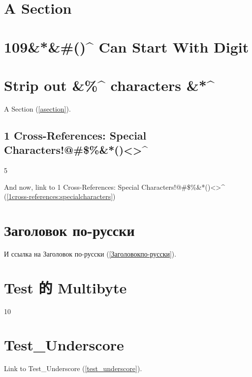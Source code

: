
\def\mytitle{Cross-References}


\part{A Section}
\label{asection}

\part{109\&*\&\#()\^{} Can Start With Digit}
\label{109canstartwithdigit}

\part{Strip out \&\%\^{} characters \&*\^{}}
\label{stripoutcharacters}

A Section (\autoref{asection}).

\chapter{1 Cross-References: Special Characters!@\#\$\%\&*()<>\^{}}
\label{1cross-references:specialcharacters}

5

And now, link to 1 Cross-References: Special Characters!@\#\$\%\&*()<>\^{} (\autoref{1cross-references:specialcharacters})

\part{Заголовок по-русски}
\label{Заголовокпо-русски}

И ссылка на Заголовок по-русски (\autoref{Заголовокпо-русски}).

\part{Test 的 Multibyte}
\label{test的multibyte}

10

\part{Test\_Underscore}
\label{test_underscore}

Link to Test\_Underscore (\autoref{test_underscore}).



